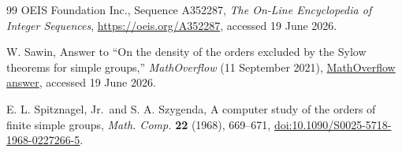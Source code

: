 \documentclass[11pt]{amsart}
\theoremstyle{definition}
\theoremstyle{remark}
\numberwithin{equation}{section}
\begin{document}
\begin{thebibliography}{99}
OEIS Foundation Inc.,
Sequence A352287,
\emph{The On-Line Encyclopedia of Integer Sequences},
\url{https://oeis.org/A352287}, accessed 19 June 2026.

W. Sawin,
Answer to ``On the density of the orders excluded by the Sylow theorems for simple groups,''
\emph{MathOverflow} (11 September 2021),
\href{https://mathoverflow.net/questions/403728/on-the-density-of-the-orders-excluded-by-the-sylow-theorems-for-simple-groups}{MathOverflow answer}, accessed 19 June 2026.

E. L. Spitznagel, Jr.\ and S. A. Szygenda,
A computer study of the orders of finite simple groups,
\emph{Math. Comp.} \textbf{22} (1968), 669--671,
\href{https://doi.org/10.1090/S0025-5718-1968-0227266-5}{doi:10.1090/S0025-5718-1968-0227266-5}.

\end{thebibliography}
\end{document}

